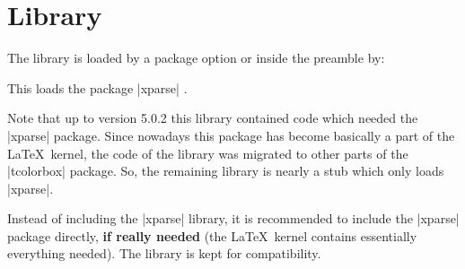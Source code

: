 \clearpage
\section{Library }\label{sec:xparse}%
%
The library is loaded by a package option or inside the preamble by:
\begin{dispListing}
\end{dispListing}
This loads the package |xparse| \cite{latexproject:xparse}.

Note that up to version 5.0.2 this library contained code which
needed the |xparse| package. Since nowadays this package has become
basically a part of the \LaTeX\ kernel, the code of the library was
migrated to other parts of the |tcolorbox| package. So, the remaining
library is nearly a stub which only loads |xparse|.

Instead of including the |xparse| library, it is recommended to include the
|xparse| package directly, \textbf{if really needed} (the \LaTeX\ kernel contains
essentially everything needed). The library is kept for compatibility.
